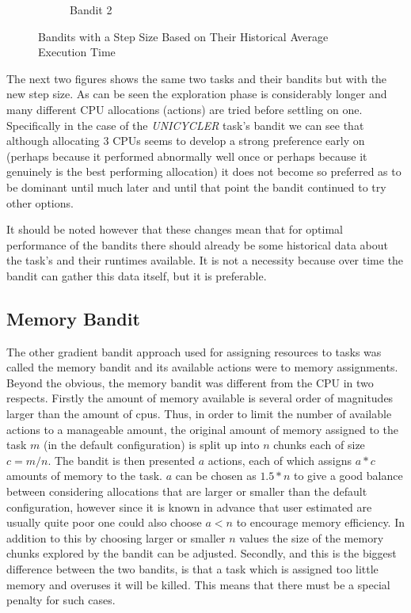 \begin{figure}[ht]
\begin{subfigure}{.5\textwidth}
  \caption{Bandit 2}
\end{subfigure}
\caption{Bandits with a Step Size Based on Their Historical Average Execution Time}
\label{fig:fixed_bandits}
\end{figure}

The next two figures shows the same two tasks and their bandits but with the new step size. As can be seen the exploration phase is considerably longer and many different CPU allocations (actions) are tried before settling on one. Specifically in the case of the \textit{UNICYCLER} task’s bandit we can see that although allocating 3 CPUs seems to develop a strong preference early on (perhaps because it performed abnormally well once or perhaps because it genuinely is the best performing allocation) it does not become so preferred as to be dominant until much later and until that point the bandit continued to try other options.

It should be noted however that these changes mean that for optimal performance of the bandits there should already be some historical data about the task’s and their runtimes available. It is not a necessity because over time the bandit can gather this data itself, but it is preferable.

\subsection{Memory Bandit}
\label{sub:mem_bandit}
The other gradient bandit approach used for assigning resources to tasks was called the memory bandit and its available actions were to memory assignments. Beyond the obvious, the memory bandit was different from the CPU in two respects. Firstly the amount of memory available is several order of magnitudes larger than the amount of cpus. Thus, in order to limit the number of available actions to a manageable amount, the original amount of memory assigned to the task $m$ (in the default configuration) is split up into $n$ chunks each of size $c=m/n$. The bandit is then presented $a$ actions, each of which assigns $a*c$ amounts of memory to the task. $a$ can be chosen as $1.5*n$ to give a good balance between considering allocations that are larger or smaller than the default configuration, however since it is known in advance that user estimated are usually quite poor one could also choose $a < n$ to encourage memory efficiency. In addition to this by choosing larger or smaller $n$ values the size of the memory chunks explored by the bandit can be adjusted. Secondly, and this is the biggest difference between the two bandits, is that a task which is assigned too little memory and overuses it will be killed. This means that there must be a special penalty for such cases.

